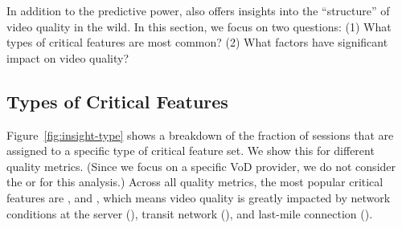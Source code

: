 In addition to the predictive power, \dda also offers 
 insights into the ``structure'' of video quality in the wild. 
In this section, we  focus on two questions:
(1) What types of critical features are most common?
(2) What factors have significant impact on video quality?

\subsection{Types of Critical Features} 
\label{subsec:insight-type}


Figure~\ref{fig:insight-type} shows a breakdown of the 
fraction of sessions that are assigned to a specific 
type of critical feature set. We show this for  different 
quality metrics. 
(Since we focus on a specific VoD provider, we do 
not consider the \fSite or \fLiveOrVoD for this analysis.)
Across all quality metrics, the most popular critical 
features are \fCDN, \fASN and \fConnectionType, which 
means video quality is greatly impacted by network 
conditions at the server (\fCDN), transit network (\fASN),
and last-mile connection (\fConnectionType).  

